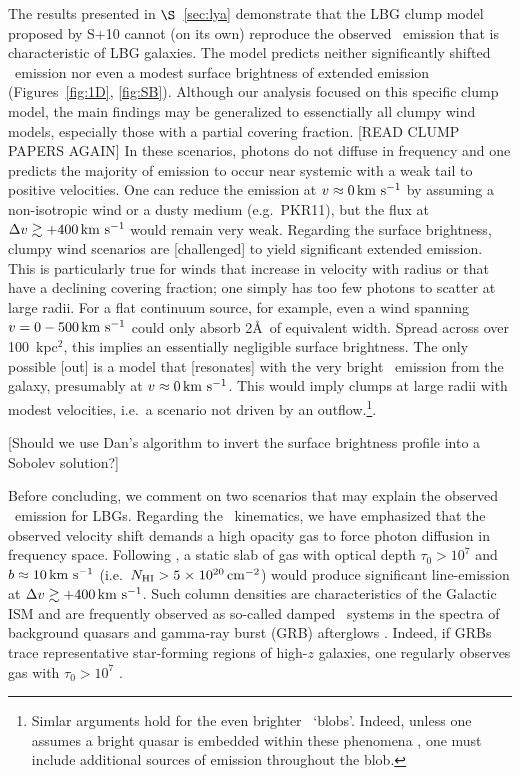 \documentclass[12pt,preprint]{aastex}
\begin{document}
The results presented in $\S$~\ref{sec:lya} demonstrate that the LBG
clump model proposed by S+10 cannot (on its own) reproduce the
observed \lya\ emission that is characteristic of LBG galaxies.  The
model predicts neither significantly shifted \lya\ emission nor even a
modest surface brightness of extended emission (Figures~\ref{fig:1D},
\ref{fig:SB}).  Although our analysis focused on this specific clump
model, the main findings may be generalized to essenctially all clumpy
wind models, especially those with a partial covering fraction.  
[READ CLUMP PAPERS AGAIN]
In these scenarios, photons do not diffuse in frequency and one
predicts the majority of emission to occur near systemic with a weak
tail to positive velocities.  One can reduce the emission at $v
\approx 0 \, {\rm km~s^{-1}}$ by assuming a non-isotropic wind or a dusty medium 
(e.g.\ PKR11), but the flux at $\Delta v \gtrsim +400 \, {\rm km~s^{-1}}$ would
remain very weak. Regarding the surface brightness, clumpy wind scenarios 
are [challenged] to yield significant extended
emission. This is particularly true for winds that increase in
velocity with radius or that have a declining covering
fraction;  one simply has too few photons to scatter at large
radii.  For a flat continuum source, for example, even a wind spanning
$v = 0 - 500 \, {\rm km~s^{-1}}$ could only absorb 2\AA\ of equivalent width.  
Spread across over 100~kpc$^2$, this implies an essentially negligible
surface brightness.  The only possible [out] is a model that
[resonates] with the very bright \lya\ emission from the galaxy, 
presumably at $v \approx 0 \, {\rm km~s^{-1}}$.  This would imply clumps at large
radii with modest velocities, i.e.\ a scenario not driven by an
outflow.\footnote{Simlar arguments hold for the even brighter \lya\
  `blobs'.  Indeed, unless one assumes a bright quasar is embedded
  within these phenomena \citep{hpz+09}, one must include additional
 sources of emission throughout the blob.}.  

[Should we use Dan's algorithm to invert the surface brightness
profile into a Sobolev solution?]

Before concluding, we comment on two scenarios that may explain the
observed \lya\ emission for LBGs.  Regarding the \lya\ kinematics, we
have emphasized that the observed velocity shift demands a high
opacity gas to force photon diffusion in frequency space.  Following
\cite{neufeld91}, a static slab of gas with optical depth $\tau_0 >
10^7$ and $b \approx 10 \, {\rm km~s^{-1}}$ (i.e.\ $N_{\rm HI} > 5{\; \times \; 10^{20}} \, {\rm cm^{-2}}$) would
produce significant line-emission at $\Delta v \gtrsim +400 \, {\rm km~s^{-1}}$.  
Such column densities are characteristics of the Galactic ISM and are
frequently observed as so-called damped \lya\ systems in the spectra
of background quasars and gamma-ray burst (GRB) afterglows
\citep[e.g.][]{phw05,wgp05,pcd+08}.   Indeed, if GRBs trace
representative star-forming regions of high-$z$ galaxies, one
regularly observes  gas with $\tau_0 > 10^7$ \citep{otherguy,pcd+08}.
\end{document}
